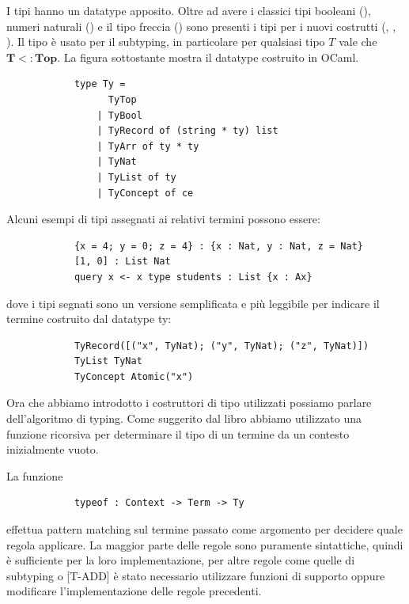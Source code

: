         I tipi hanno un datatype apposito. Oltre ad avere i classici tipi booleani (), numeri naturali () e il tipo freccia () 
        sono presenti i tipi per i nuovi costrutti (, , ). Il tipo  è usato per il subtyping, in particolare per
        qualsiasi tipo $T$ vale che $\boldsymbol{T <: Top}$. La figura sottostante mostra il datatype costruito in OCaml.
        \begin{verbatim}
            type Ty =
                  TyTop 
                | TyBool 
                | TyRecord of (string * ty) list 
                | TyArr of ty * ty 
                | TyNat 
                | TyList of ty
                | TyConcept of ce
        \end{verbatim}
        Alcuni esempi di tipi assegnati ai relativi termini possono essere:
        \begin{verbatim}
            {x = 4; y = 0; z = 4} : {x : Nat, y : Nat, z = Nat}
            [1, 0] : List Nat
            query x <- x type students : List {x : Ax}
        \end{verbatim}
        dove i tipi segnati sono un versione semplificata e più leggibile per indicare il termine costruito dal datatype ty:
        \begin{verbatim}
            TyRecord([("x", TyNat); ("y", TyNat); ("z", TyNat)])
            TyList TyNat
            TyConcept Atomic("x")
        \end{verbatim}
        Ora che abbiamo introdotto i costruttori di tipo utilizzati possiamo parlare dell'algoritmo di typing.
        Come suggerito dal libro \cite{pierceTypesBook} abbiamo utilizzato una funzione ricorsiva per determinare il tipo di un termine da un contesto
        inizialmente vuoto.
 
 La funzione   
        \begin{verbatim}
            typeof : Context -> Term -> Ty
        \end{verbatim}
 effettua pattern matching sul termine passato come argomento per decidere quale regola applicare. La maggior parte delle regole sono puramente
        sintattiche, quindi  è sufficiente per la loro implementazione, per altre regole come quelle di subtyping o [T-ADD] è stato necessario utilizzare funzioni di supporto
        oppure modificare l'implementazione delle regole precedenti. 
        
